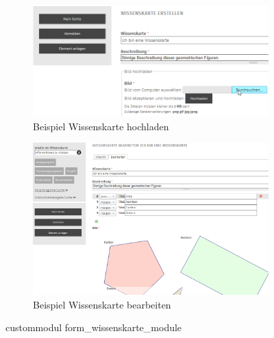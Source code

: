 \begin{figure}[H]
	\centering
	\begin{subfigure}[b]{0.45\textwidth}
		\centering
		\includegraphics[width=0.95\linewidth]{images/example_knowledgemap_upload}
		\caption[]{Beispiel Wissenskarte hochladen}
		\label{fig:example_wissenskarte_upload}
	\end{subfigure}
	\begin{subfigure}[b]{0.45\textwidth}
		\centering
		\includegraphics[width=0.95\linewidth]{images/example_knowledgemap_edit}
		\caption[]{Beispiel Wissenskarte bearbeiten}
		\label{fig:example_wissenskarte_edit}
	\end{subfigure}
	\caption{\gls{custommodul} form\_wissenskarte\_module}
	\label{fig:example_form_wissenskarte_module}
\end{figure}

